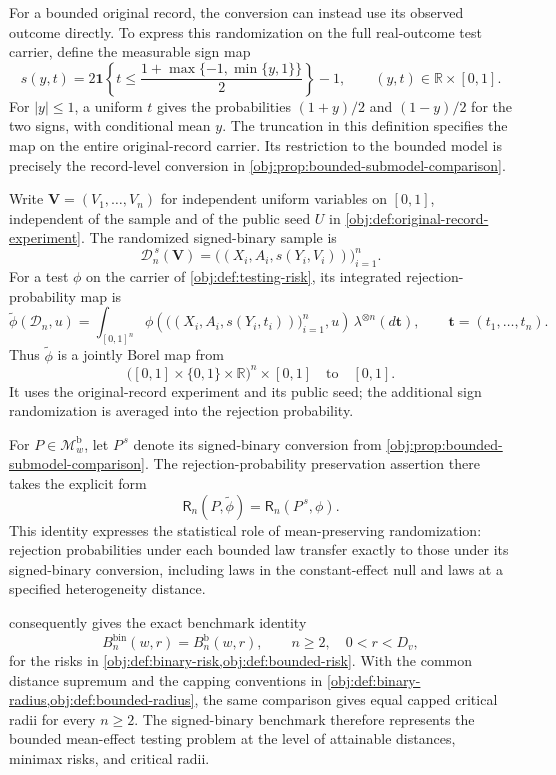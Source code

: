 For a bounded original record, the conversion can instead use its observed outcome directly. To express this randomization on the full real-outcome test carrier, define the measurable sign map
\[
s(y,t)
=
2\mathbf 1\!\left\{
t\le \frac{1+\max\{-1,\min\{y,1\}\}}2
\right\}-1,
\qquad (y,t)\in\mathbb R\times[0,1].
\]
For \(|y|\le1\), a uniform \(t\) gives the probabilities \((1+y)/2\) and \((1-y)/2\) for the two signs, with conditional mean \(y\). The truncation in this definition specifies the map on the entire original-record carrier. Its restriction to the bounded model is precisely the record-level conversion in \cref{obj:prop:bounded-submodel-comparison}.

Write \(\boldsymbol V=(V_1,\ldots,V_n)\) for independent uniform variables on \([0,1]\), independent of the sample and of the public seed \(U\) in \cref{obj:def:original-record-experiment}. The randomized signed-binary sample is
\[
\mathcal D_n^{\,s}(\boldsymbol V)
=
\bigl((X_i,A_i,s(Y_i,V_i))\bigr)_{i=1}^n.
\]
For a test \(\phi\) on the carrier of \cref{obj:def:testing-risk}, its integrated rejection-probability map is
\[
\widetilde\phi(\mathcal D_n,u)
=
\int_{[0,1]^n}
\phi\!\left(
\bigl((X_i,A_i,s(Y_i,t_i))\bigr)_{i=1}^n,u
\right)
\,\lambda^{\otimes n}(d\boldsymbol t),
\qquad
\boldsymbol t=(t_1,\ldots,t_n).
\]
Thus \(\widetilde\phi\) is a jointly Borel map from
\[
\bigl([0,1]\times\{0,1\}\times\mathbb R\bigr)^n\times[0,1]
\quad\text{to}\quad[0,1].
\]
It uses the original-record experiment and its public seed; the additional sign randomization is averaged into the rejection probability.

For \(P\in\mathcal M_w^{\mathrm b}\), let \(P^{\,s}\) denote its signed-binary conversion from \cref{obj:prop:bounded-submodel-comparison}. The rejection-probability preservation assertion there takes the explicit form
\[
\mathsf R_n(P,\widetilde\phi)
=
\mathsf R_n(P^{\,s},\phi).
\]
This identity expresses the statistical role of mean-preserving randomization: rejection probabilities under each bounded law transfer exactly to those under its signed-binary conversion, including laws in the constant-effect null and laws at a specified heterogeneity distance.

 consequently gives the exact benchmark identity
\[
B_n^{\mathrm{bin}}(w,r)=B_n^{\mathrm b}(w,r),
\qquad n\ge2,\quad 0<r<D_v,
\]
for the risks in \cref{obj:def:binary-risk,obj:def:bounded-risk}. With the common distance supremum and the capping conventions in \cref{obj:def:binary-radius,obj:def:bounded-radius}, the same comparison gives equal capped critical radii for every \(n\ge2\). The signed-binary benchmark therefore represents the bounded mean-effect testing problem at the level of attainable distances, minimax risks, and critical radii.

